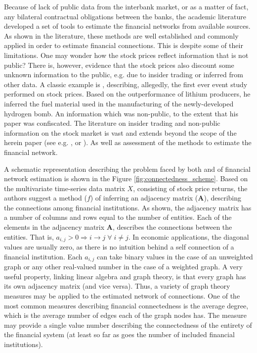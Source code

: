 \documentclass[12pt]{article}
\begin{document}
Because of lack of public data from the interbank market, or as a matter of fact, any bilateral contractual obligations between the banks, the academic literature developed a set of tools to estimate the financial networks from available sources. As shown in the literature, these methods are well established and commonly applied in order to estimate financial connections. This is despite some of their limitations. One may wonder how the stock prices reflect information that is not public? There is, however, evidence that the stock prices also discount some unknown information to the public, e.g. due to insider trading or inferred from other data. A classic example is \cite{newhard14}, describing, allegedly, the first ever event study performed on stock prices. Based on the outperformance of lithium producers, he inferred the fuel material used in the manufacturing of the newly-developed hydrogen bomb. An information which was non-public, to the extent that his paper was confiscated. The literature on insider trading and non-public information on the stock market is vast and extends beyond the scope of the herein paper (see e.g. \cite{hawk90}, \cite{huddart07} or \cite{klein20}). As well as assessment of the methods to estimate the financial network.

A schematic representation describing the problem faced by both \cite{billio12} and \cite{diebold17} of financial network estimation is shown in the Figure \ref{fig:connectedness_scheme}. Based on the multivariate time-series data matrix $X$, consisting of stock price returns, the authors suggest a method ($f$) of inferring an adjacency matrix ($\boldsymbol{A}$), describing the connections among financial institutions. As shown, the adjacency matrix has a number of columns and rows equal to the number of entities. Each of the elements in the adjacency matrix $\boldsymbol{A}$, describes the connections between the entities. That is, $a_{i,j} > 0 \Rightarrow i \rightarrow j \; \forall \;  i \neq j$. In economic applications, the diagonal values are usually zero, as there is no intuition behind a self connection of a financial institution. Each $a_{i,j}$ can take binary values in the case of an unweighted graph or any other real-valued number in the case of a weighted graph. A very useful property, linking linear algebra and graph theory, is that every graph has its own adjacency matrix (and vice versa). Thus, a variety of graph theory measures may be applied to the estimated network of connections. One of the most common measures describing financial connectedness is the average degree, which is the average number of edges each of the graph nodes has. The measure may provide a single value number describing the connectedness of the entirety of the financial system (at least so far as goes the number of included financial institutions). 
\end{document}
